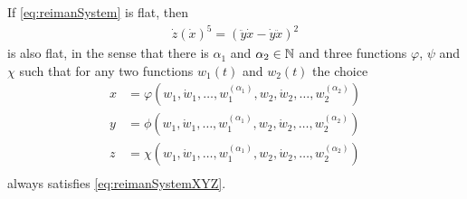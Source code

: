 \documentclass[12pt]{article}
\begin{document}
\begin{lemma} \label{simplificationOfReimanSystem}

If \eqref{eq:reimanSystem} is flat, then
\begin{align} \label{eq:reimanSystemXYZ}
  \dot{z} (\dot{x})^5 = (\ddot{y}\dot{x} - \dot{y}\ddot{x})^2
\end{align}
is also flat, in the sense that there is $\alpha_1$ and $\alpha_2 \in \mathbb{N}$ and
three functions $\varphi$, $\psi$ and $\chi$ such that for any two functions $w_1(t)$ and $w_2(t)$ the choice
\begin{equation} \label{eq:reimanSystemXYZDefFlat}
\begin{aligned} 
  x &= \varphi( w_1, \dot{w}_1, \ldots, w_1^{(\alpha_1)}, w_2, \dot{w}_2, \ldots, w_2^{(\alpha_2)} ) \\
  y &= \phi( w_1, \dot{w}_1, \ldots, w_1^{(\alpha_1)}, w_2, \dot{w}_2, \ldots, w_2^{(\alpha_2)} ) \\
  z &= \chi( w_1, \dot{w}_1, \ldots, w_1^{(\alpha_1)}, w_2, \dot{w}_2, \ldots, w_2^{(\alpha_2)} ) \\
\end{aligned}
\end{equation}
always satisfies \eqref{eq:reimanSystemXYZ}.
\end{lemma}
\end{document}

